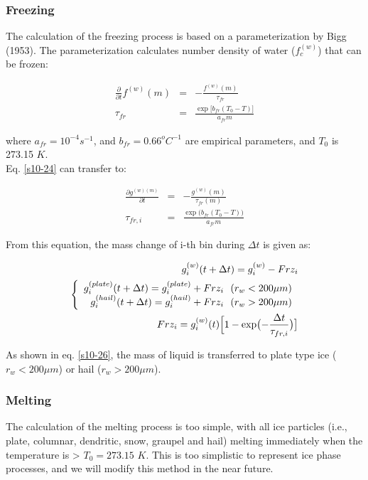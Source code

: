 \subsubsection{Freezing}
The calculation of the freezing process is based on a parameterization by Bigg (1953)\cite{bigg_1953}. The parameterization calculates number density of water ($f_{c}^{(w)}$) that can be frozen:

\begin{eqnarray}
\frac{\partial}{\partial t}f^{(w)}(m)&=&-\frac{f^{(w)}(m)}{\tau_{fr}}\label{s10-24}\\
\tau_{fr}&=&\frac{\exp \bigl[b_{fr}(T_{0}-T)\bigr]}{a_{fr} m}\nonumber
\end{eqnarray}

where $a_{fr}=10^{-4}s^{-1}$, and $b_{fr}=0.66^{o}C^{-1}$ are empirical parameters, and $T_{0}$ is 273.15 $K$.\\
Eq. \ref{s10-24} can transfer to:

\begin{eqnarray}
\frac{\partial g^{(w)(m)}}{\partial t}&=&-\frac{g^{(w)}(m)}{\tau_{fr}(m)}\\
\tau_{fr,i}&=&\frac{\exp\bigl (b_{fr}(T_{0}-T)\bigr )}{a_{fr}m}\nonumber
\end{eqnarray}

From this equation, the mass change of i-th bin during $\Delta t$ is given as:

\begin{eqnarray}
g_{i}^{(w)}(t+\Delta t)=g_{i}^{(w)}-Frz_{i}\\
\left \{
\begin{array}{r}
g_{i}^{(plate)}(t+\Delta t)=g_{i}^{(plate)}+Frz_{i}\:\:\: (r_{w}<200\mu m)\\
g_{i}^{(hail)}(t+\Delta t)=g_{i}^{(hail)}+Frz_{i}\:\:\: (r_{w}>200\mu m)
\end{array} \right.\label{s10-26}\\
Frz_{i}=g_{i}^{(w)}(t)\Bigl [1-\exp\bigl (-\frac{\Delta t}{\tau_{fr,i}}\bigr )\bigr]\nonumber
\end{eqnarray}


 As shown in eq. \ref{s10-26}, the mass of liquid is transferred to plate type ice ($r_{w}<200\mu m$) or hail ($r_{w}>200\mu m$).

\subsubsection{Melting}
The calculation of the melting process is too simple, with all ice particles (i.e., plate, columnar, dendritic, snow, graupel and hail) melting immediately when the temperature is > $T_{0}=273.15$ $K$. This is too simplistic to represent ice phase processes, and we will modify this method in the near future.


